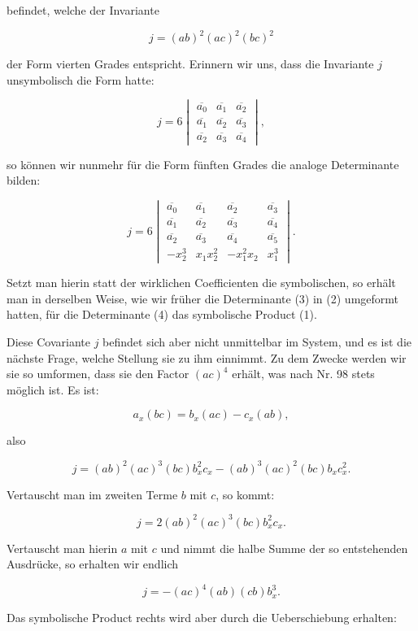 \documentclass[11pt]{article}
\providecommand{\weq}[2]{\begin{equation}\tag{#1}#2\end{equation}}
\begin{document}
befindet, welche der Invariante

\weq{2}{j = (ab)^2 (ac)^2 (bc)^2}

der Form vierten Grades entspricht. Erinnern wir uns, dass die
Invariante $j$ unsymbolisch die Form hatte:

\weq{3}{j = 6 \begin{vmatrix} \overline{a_0} & \overline{a_1} & \overline{a_2} \\ \overline{a_1} & \overline{a_2} & \overline{a_3} \\ \overline{a_2} & \overline{a_3} & \overline{a_4} \end{vmatrix},}

so können wir nunmehr für die Form fünften Grades die analoge
Determinante bilden:

\weq{4}{j = 6 \begin{vmatrix} \overline{a_0} & \overline{a_1} & \overline{a_2} & \overline{a_3} \\ \overline{a_1} & \overline{a_2} & \overline{a_3} & \overline{a_4} \\ \overline{a_2} & \overline{a_3} & \overline{a_4} & \overline{a_5} \\ -x_2^3 & x_1 x_2^2 & -x_1^2 x_2 & x_1^3 \end{vmatrix}.}

Setzt man hierin statt der wirklichen Coefficienten die symbolischen,
so erhält man in derselben Weise, wie wir früher die Determinante
(3) in (2) umgeformt hatten, für die Determinante (4) das symbolische
Product (1).

Diese Covariante $j$ befindet sich aber nicht unmittelbar im
System, und es ist die nächste Frage, welche Stellung sie zu ihm
einnimmt. Zu dem Zwecke werden wir sie so umformen, dass sie
den Factor $(ac)^4$ erhält, was nach Nr. 98 stets möglich ist. Es ist:

\[ a_x (bc) = b_x (ac) - c_x (ab), \]

also

\[ j = (ab)^2 (ac)^3 (bc) b_x^2 c_x - (ab)^3 (ac)^2 (bc) b_x c_x^2. \]

Vertauscht man im zweiten Terme $b$ mit $c$, so kommt:

\[ j = 2 (ab)^2 (ac)^3 (bc) b_x^2 c_x. \]

Vertauscht man hierin $a$ mit $c$ und nimmt die halbe Summe der so
entstehenden Ausdrücke, so erhalten wir endlich

\[ j = -(ac)^4 (ab) (cb) b_x^3. \]

Das symbolische Product rechts wird aber durch die Ueberschiebung
erhalten:
\end{document}
